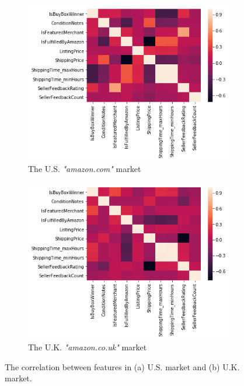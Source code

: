 \begin{figure}
	\begin{subfigure}{0.5\textwidth}
		\includegraphics[width=\linewidth]{fig_market_US_corr.png}
		\caption{The U.S. \textit{"amazon.com"} market } \label{fig:corrus}
	\end{subfigure}
	\hspace*{\fill} %
	\begin{subfigure}{0.5\textwidth}
		\includegraphics[width=\linewidth]{fig_market_UK_corr.png}
		\caption{The U.K. \textit{"amazon.co.uk"} market} \label{fig:corrfr}
	\end{subfigure}
	\caption{The correlation between features in (a) U.S. market and (b) U.K. market.} \label{fig:corr}
\end{figure}

